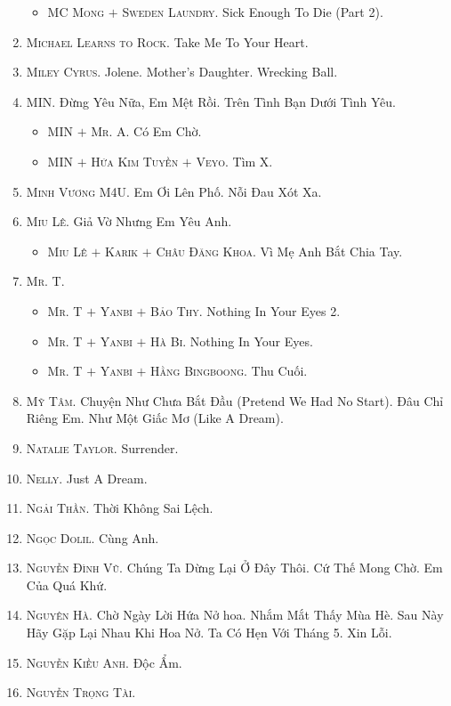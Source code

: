 \documentclass[oneside]{book}
\numberwithin{equation}{section}
\begin{document}
\begin{enumerate}
\begin{itemize}
		\item \textsc{MC Mong $+$ Sweden Laundry.} Sick Enough To Die (Part 2).
	\end{itemize}
	\item \textsc{Michael Learns to Rock.} Take Me To Your Heart.
	\item \textsc{Miley Cyrus.} Jolene. Mother's Daughter. Wrecking Ball.
	\item \textsc{MIN.} Đừng Yêu Nữa, Em Mệt Rồi. Trên Tình Bạn Dưới Tình Yêu.
	\begin{itemize}
		\item \textsc{MIN $+$ Mr. A.} Có Em Chờ.
		\item \textsc{MIN $+$ Hứa Kim Tuyền $+$ Veyo.} Tìm X.
	\end{itemize}
	\item \textsc{Minh Vương M4U.} Em Ơi Lên Phố. Nỗi Đau Xót Xa.
	\item \textsc{Miu Lê.} Giả Vờ Nhưng Em Yêu Anh.
	\begin{itemize}
		\item \textsc{Miu Lê $+$ Karik $+$ Châu Đăng Khoa.} Vì Mẹ Anh Bắt Chia Tay.
	\end{itemize}
	\item \textsc{Mr. T.}
	\begin{itemize}
		\item \textsc{Mr. T $+$ Yanbi $+$ Bảo Thy.} Nothing In Your Eyes 2.
		\item \textsc{Mr. T $+$ Yanbi $+$ Hà Bi.} Nothing In Your Eyes.
		\item \textsc{Mr. T $+$ Yanbi $+$ Hằng Bingboong.} Thu Cuối.
	\end{itemize}
	\item \textsc{Mỹ Tâm.} Chuyện Như Chưa Bắt Đầu (Pretend We Had No Start). Đâu Chỉ Riêng Em. Như Một Giấc Mơ (Like A Dream).
	\item \textsc{Natalie Taylor.} Surrender.
	\item \textsc{Nelly.} Just A Dream.
	\item \textsc{Ngải Thần.} Thời Không Sai Lệch.
	\item \textsc{Ngọc Dolil.} Cùng Anh.
	\item \textsc{Nguyễn Đình Vũ.} Chúng Ta Dừng Lại Ở Đây Thôi. Cứ Thế Mong Chờ. Em Của Quá Khứ.
	\item \textsc{Nguyên Hà.} Chờ Ngày Lời Hứa Nở hoa. Nhắm Mắt Thấy Mùa Hè. Sau Này Hãy Gặp Lại Nhau Khi Hoa Nở. Ta Có Hẹn Với Tháng 5. Xin Lỗi.
	\item \textsc{Nguyễn Kiều Anh.} Độc Ẩm.
	\item \textsc{Nguyễn Trọng Tài.}

\end{enumerate}
\end{document}
